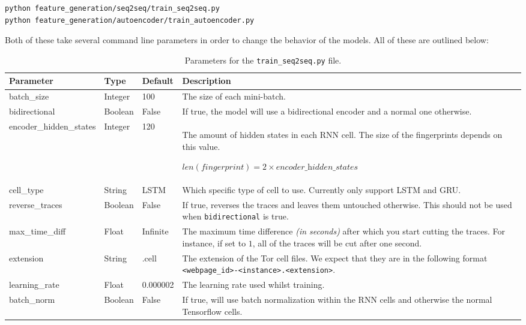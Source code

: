 \begin{lstlisting}[language=Bash]
python feature_generation/seq2seq/train_seq2seq.py
python feature_generation/autoencoder/train_autoencoder.py
\end{lstlisting}

Both of these take several command line parameters in order to change the behavior of the models.
All of these are outlined below:

\newpage

\begin{table}[ht]
  \centering
  \begin{tabular}{ l | l | l | p{} }
    \textbf{Parameter} & \textbf{Type} & \textbf{Default} & \textbf{Description} \\ \hline \hline
    batch\_size & Integer & 100 & The size of each mini-batch. \\ \hline
    bidirectional & Boolean & False & If true, the model will use a bidirectional encoder and a normal one otherwise. \\ \hline
    encoder\_hidden\_states & Integer & 120 & The amount of hidden states in each RNN cell. The size of the fingerprints depends on this value. \par $\textit{len}(\textit{fingerprint}) = 2 \times \textit{encoder\_hidden\_states}$ \\ \hline
    cell\_type & String & LSTM & Which specific type of cell to use. Currently only support LSTM and GRU. \\ \hline
    reverse\_traces & Boolean & False & If true, reverses the traces and leaves them untouched otherwise. This should not be used when \texttt{bidirectional} is true. \\ \hline
    max\_time\_diff & Float & Infinite & The maximum time difference \textit{(in seconds)} after which you start cutting the traces. For instance, if set to $1$, all of the traces will be cut after one second.\\ \hline
    extension & String & .cell & The extension of the Tor cell files. We expect that they are in the following format \texttt{<webpage\_id>-<instance>.<extension>}. \\ \hline
    learning\_rate & Float & 0.000002 & The learning rate used whilst training. \\ \hline
    batch\_norm & Boolean & False & If true, will use batch normalization within the RNN cells and otherwise the normal Tensorflow cells.
  \end{tabular}
  \caption{Parameters for the \texttt{train\_seq2seq.py} file.}
\end{table}

